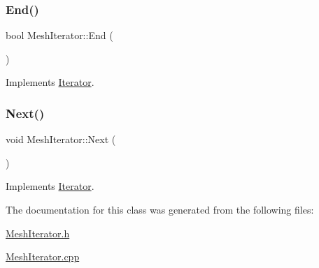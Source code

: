 \mbox{\label{class_mesh_iterator_aab37f952147b0b24bd22e469f23605fd}} 
\subsubsection{\texorpdfstring{End()}{End()}}
{\footnotesize\ttfamily bool Mesh\+Iterator\+::\+End (\begin{DoxyParamCaption}{ }\end{DoxyParamCaption})\hspace{0.3cm}{\ttfamily [virtual]}}



Implements \mbox{\hyperlink{class_iterator_a7cebd24c11b2f4577f72e228f849d092}{Iterator}}.

\mbox{\label{class_mesh_iterator_ab680a0183b6365f5ec200be9dbce011b}} 
\subsubsection{\texorpdfstring{Next()}{Next()}}
{\footnotesize\ttfamily void Mesh\+Iterator\+::\+Next (\begin{DoxyParamCaption}{ }\end{DoxyParamCaption})\hspace{0.3cm}{\ttfamily [virtual]}}



Implements \mbox{\hyperlink{class_iterator_a124e522942b3a5f058ad9091fe74c283}{Iterator}}.



The documentation for this class was generated from the following files\+:\begin{DoxyCompactItemize}
\item 
\mbox{\hyperlink{_mesh_iterator_8h}{Mesh\+Iterator.\+h}}\item 
\mbox{\hyperlink{_mesh_iterator_8cpp}{Mesh\+Iterator.\+cpp}}\end{DoxyCompactItemize}
